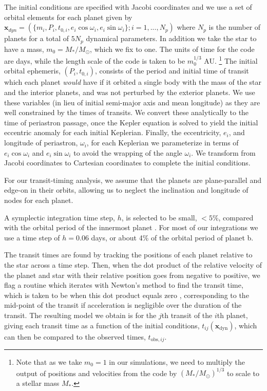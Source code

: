 \documentclass[twocolumn]{aastex63}
\begin{document}
The initial conditions are specified with Jacobi coordinates and
we use a set of orbital elements for each planet given by
$\mathbf{x}_{dyn} = (\{m_i,P_i,t_{0,i},e_i \cos{\omega_i},e_i\sin{\omega_i}\}; i = 1,...,N_p)$
where $N_p$ is the number of planets for a total of $5N_p$ dynamical parameters. In
addition we take the star to have a mass, $m_0 = M_*/M_\odot$, which we fix to one.
The units of time for the code are days, while the length scale of the code is taken to be $m_0^{1/3}$ AU. \footnote{Note that as we take $m_0=1$ in our simulations, we need to multiply
    the output of positions and velocities from the code by $(M_*/M_\odot)^{1/3}$ to scale to a stellar mass $M_*$.}
The initial orbital ephemeris, $(P_i,t_{0,i})$, consists of the period and initial time of
transit which each planet {\it would} have if it orbited a single
body with the mass of the star and the interior planets, and was
not perturbed by the exterior planets.  We use these variables (in lieu of initial semi-major axis and mean longitude) as
they are well constrained by the times of transits.  We convert
these analytically to the time of periastron passage, once the
Kepler equation is solved to yield the initial eccentric anomaly
for each initial Keplerian.  Finally, the eccentricity, $e_i$, and
longitude of periastron, $\omega_i$, for each Keplerian we
parameterize in terms of $e_i\cos{\omega_i}$ and $e_i\sin{\omega_i}$
to avoid the wrapping of the angle $\omega_i$.   We transform from Jacobi coordinates to Cartesian coordinates to complete the initial conditions.

For our transit-timing analysis, we assume that the planets are
plane-parallel and edge-on in their orbits, allowing us to neglect
the inclination and longitude of nodes for each planet.

A symplectic integration time step, $h$, is selected to be small,
${<} 5$\%, compared with the orbital period of the innermost planet
\citep{Wisdom1991}. For most of our integrations we use a time step
of $h=0.06$ days, or about 4\% of the orbital period of planet b.

The transit times are found by tracking the positions of each
planet relative to the star across a time step.  Then, when the
dot product of the relative velocity of the planet and star
with their relative position goes from negative to positive,
we flag a routine which iterates with Newton's method to find
the transit time, which is taken to be when this dot product
equals zero \citep{Fabrycky2010}, corresponding to the mid-point
of the transit if acceleration is negligible over the duration of the
transit.  The resulting model we obtain
is for the $j$th transit of the $i$th planet, giving each
transit time as a function of the initial conditions, $t_{ij}(\mathbf{x}_\mathrm{dyn})$, which can then be compared to the observed times, $t_{\mathrm{obs},ij}$.
\end{document}
